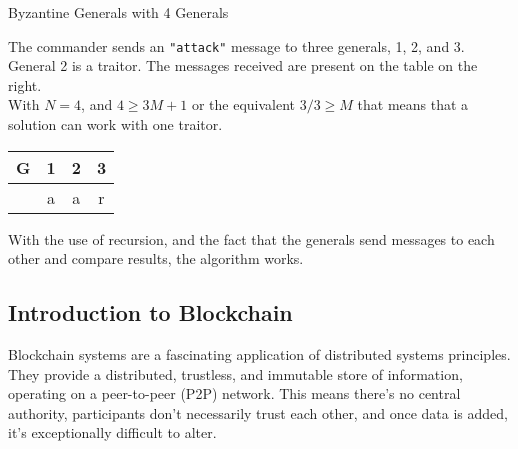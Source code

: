 \begin{example}{Byzantine Generals with 4 Generals}
\begin{minipage}{0.75\textwidth} %
The commander sends an \texttt{"attack"} message to three generals, 1, 2, and 3. General 2 is a traitor. The messages received are present on the table on the right. \\

With $N=4$, and $4 \geq 3M+1$ or the equivalent $3/3 \geq M$ that means that a solution can work with one traitor.
\end{minipage}
\hfill
\begin{minipage}{0.2\textwidth} %
\begin{center}
\begin{tabular}{|c|c|c|c|}
    \hline
    G & 1 & 2 & 3 \\ \hline
    ~ & a & a & r \\ \hline
\end{tabular}
\end{center}
\end{minipage}
\end{example}

With the use of recursion, and the fact that the generals send messages to each other and compare results, the algorithm works.

\subsection{Introduction to Blockchain}
Blockchain systems are a fascinating application of distributed systems principles. They provide a distributed, trustless, and immutable store of information, operating on a peer-to-peer (P2P) network.  This means there's no central authority, participants don't necessarily trust each other, and once data is added, it's exceptionally difficult to alter.

